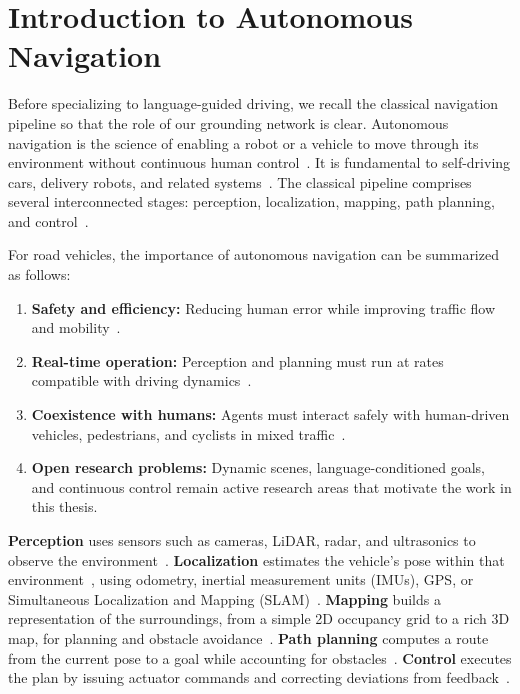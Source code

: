 \section{Introduction to Autonomous Navigation}

Before specializing to language-guided driving, we recall the classical navigation pipeline so that the role of our grounding network is clear. Autonomous navigation is the science of enabling a robot or a vehicle to move through its environment without continuous human control~\cite{Thrun2005}. It is fundamental to self-driving cars, delivery robots, and related systems~\cite{Siegwart2011, Siciliano2016}. The classical pipeline comprises several interconnected stages: perception, localization, mapping, path planning, and control~\cite{Latombe1991}.

For road vehicles, the importance of autonomous navigation can be summarized as follows:

\begin{enumerate}
\item \textbf{Safety and efficiency:} Reducing human error while improving traffic flow and mobility~\cite{Toghi2021}.
\item \textbf{Real-time operation:} Perception and planning must run at rates compatible with driving dynamics~\cite{Dominguez2015}.
\item \textbf{Coexistence with humans:} Agents must interact safely with human-driven vehicles, pedestrians, and cyclists in mixed traffic~\cite{Toghi2021}.
\item \textbf{Open research problems:} Dynamic scenes, language-conditioned goals, and continuous control remain active research areas that motivate the work in this thesis.
\end{enumerate}

\textbf{Perception} uses sensors such as cameras, LiDAR, radar, and ultrasonics to observe the environment~\cite{Borenstein1996,Siegwart2011}.
\textbf{Localization} estimates the vehicle's pose within that environment~\cite{Thrun2005}, using odometry, inertial measurement units (IMUs), GPS, or Simultaneous Localization and Mapping (SLAM)~\cite{DurrantWhyte2006}.
\textbf{Mapping} builds a representation of the surroundings, from a simple 2D occupancy grid to a rich 3D map, for planning and obstacle avoidance~\cite{Thrun2002,Elfes1989}.
\textbf{Path planning} computes a route from the current pose to a goal while accounting for obstacles~\cite{LaValle2006,Kavraki1996}.
\textbf{Control} executes the plan by issuing actuator commands and correcting deviations from feedback~\cite{Siciliano2010}.

